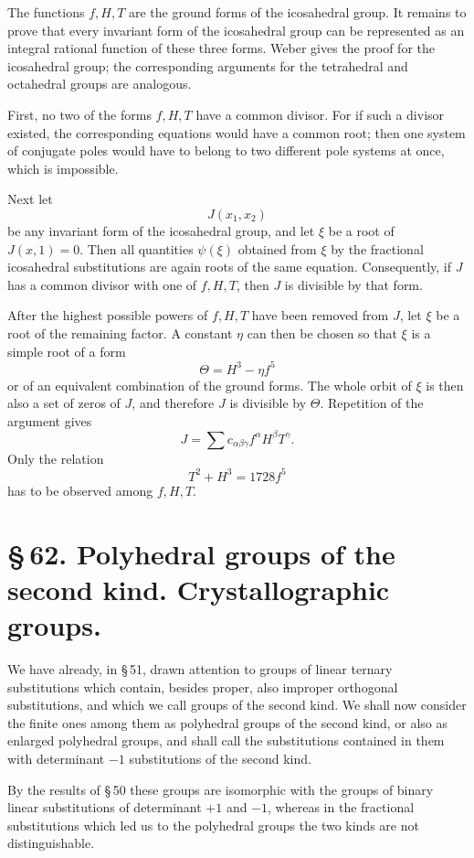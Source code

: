 \documentclass[11pt]{article}
\begin{document}
The functions $f,H,T$ are the ground forms of the icosahedral group. It remains to prove that every invariant form of the icosahedral group can be represented as an integral rational function of these three forms. Weber gives the proof for the icosahedral group; the corresponding arguments for the tetrahedral and octahedral groups are analogous.

First, no two of the forms $f,H,T$ have a common divisor. For if such a divisor existed, the corresponding equations would have a common root; then one system of conjugate poles would have to belong to two different pole systems at once, which is impossible.

Next let
\[
 J(x_1,x_2)
\]
be any invariant form of the icosahedral group, and let $\xi$ be a root of $J(x,1)=0$. Then all quantities $\psi(\xi)$ obtained from $\xi$ by the fractional icosahedral substitutions are again roots of the same equation. Consequently, if $J$ has a common divisor with one of $f,H,T$, then $J$ is divisible by that form.

After the highest possible powers of $f,H,T$ have been removed from $J$, let $\xi$ be a root of the remaining factor. A constant $\eta$ can then be chosen so that $\xi$ is a simple root of a form
\[
 \Theta=H^3-\eta f^5
\]
or of an equivalent combination of the ground forms. The whole orbit of $\xi$ is then also a set of zeros of $J$, and therefore $J$ is divisible by $\Theta$. Repetition of the argument gives
\[
 J=\sum c_{\alpha\beta\gamma} f^\alpha H^\beta T^\gamma .
\]
Only the relation
\[
 T^2+H^3=1728f^5
\]
has to be observed among $f,H,T$.



\section*{\S\,62. Polyhedral groups of the second kind. Crystallographic groups.}

We have already, in \S\,51, drawn attention to groups of linear ternary substitutions which contain, besides proper, also improper orthogonal substitutions, and which we call groups of the second kind. We shall now consider the finite ones among them as polyhedral groups of the second kind, or also as enlarged polyhedral groups, and shall call the substitutions contained in them with determinant $-1$ substitutions of the second kind.

By the results of \S\,50 these groups are isomorphic with the groups of binary linear substitutions of determinant $+1$ and $-1$, whereas in the fractional substitutions which led us to the polyhedral groups the two kinds are not distinguishable.
\end{document}

